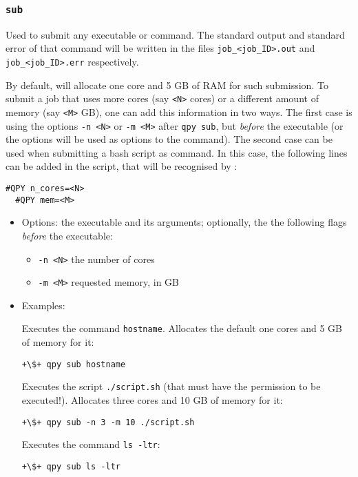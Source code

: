 \documentclass[a4paper,12pt]{article}
\begin{document}
\subsubsection{\texttt{sub}}

Used to submit any executable or command.
The standard output and standard error of that command will be written in the files \texttt{job\_<job\_ID>.out} and \texttt{job\_<job\_ID>.err} respectively.

By default, \qpy{} will allocate one core and 5 GB of RAM for such submission.
To submit a job that uses more cores (say \texttt{<N>} cores) or a different amount of memory (say \texttt{<M>} GB), one can add this information in two ways.
The first case is using the options \texttt{-n <N>} or \texttt{-m <M>} after \texttt{qpy sub}, but \emph{before} the executable (or the options will be used as options to the command).
The second case can be used when submitting a bash script as command.
In this case, the following lines can be added in the script, that will be recognised by \qpy{}:

\begin{lstlisting}[style=FileStyle]
  #QPY n_cores=<N>
  #QPY mem=<M>
\end{lstlisting}

\begin{itemize}
\item Options:
  the executable and its arguments;
  optionally, the the following flags \emph{before} the executable:
  \begin{itemize}
  \item \texttt{-n <N>} \quad   the number of cores
  \item \texttt{-m <M>} \quad   requested memory, in GB
  \end{itemize}
  
\item Examples:

  Executes the command \texttt{hostname}. Allocates the default one cores and 5 GB of memory for it:

\begin{lstlisting}[style=BashStyle]
+\$+ qpy sub hostname
\end{lstlisting}
  
  Executes the script \texttt{./script.sh} (that must have the permission to be executed!). Allocates three cores and 10 GB of memory for it:

\begin{lstlisting}[style=BashStyle]
+\$+ qpy sub -n 3 -m 10 ./script.sh 
\end{lstlisting}
  Executes the command \texttt{ls -ltr}:

\begin{lstlisting}[style=BashStyle]
+\$+ qpy sub ls -ltr
\end{lstlisting}

\end{itemize}
  
\end{document}
